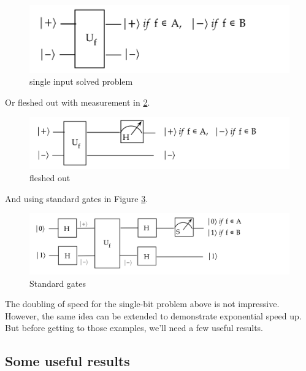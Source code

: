 \documentclass[main.tex]{subfiles}
\begin{document}
    \begin{figure}
        \centering
        \includegraphics[width=5in]{notes/figs/n11/10deutsch4.png}
            \caption{single input solved problem}
        \label{fig:10deutsch4}
    \end{figure}
    
    Or fleshed out with measurement in \ref{fig:11deutsch5}.
    
    \begin{figure}
        \centering
        \includegraphics[width=5in]{notes/figs/n11/11deutsch5.png}
            \caption{fleshed out}
        \label{fig:11deutsch5}
    \end{figure}
    
    And using standard gates in Figure \ref{fig:12deutsch6}.
    
    \begin{figure}
        \centering
        \includegraphics[width=5in]{notes/figs/n11/12deutsch6.png}
            \caption{Standard gates}
        \label{fig:12deutsch6}
    \end{figure}
    
    The doubling of speed for the single-bit problem above is not impressive. However, the same idea can be extended to demonstrate exponential speed up. But before getting to those examples, we'll need a few useful results.

\subsection{Some useful results}
\end{document}
